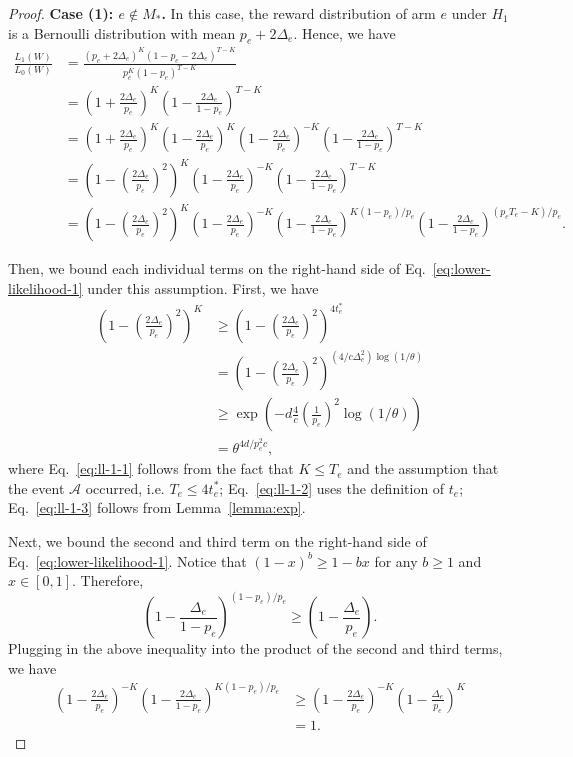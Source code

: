 \documentclass{article}
\begin{document}
\begin{spacing}{1.1}
\begin{proof}
\textbf{Case (1): $e\not \in M_*$.}
In this case, the reward distribution of arm $e$ under $H_1$ is a Bernoulli distribution with mean $p_e+2\Delta_e$. 
Hence, we have
\begin{align}
  \frac{L_1(W)}{L_0(W)} &= \frac{(p_e+2\Delta_e)^{K} (1-p_e-2\Delta_e)^{T-K}}{p_e^K(1-p_e)^{T-K}} \nonumber \\
  						&=\left(1+\frac{2\Delta_e}{p_e}\right)^K\left(1-\frac{2\Delta_e}{1-p_e}\right)^{T-K} \nonumber\\
  						&=\left(1+\frac{2\Delta_e}{p_e}\right)^K
                          \left(1-\frac{2\Delta_e}{p_e}\right)^K\left(1-\frac{2\Delta_e}{p_e}\right)^{-K}
  						  \left(1-\frac{2\Delta_e}{1-p_e}\right)^{T-K} \nonumber\\
  						&=\left(1-\left(\frac{2\Delta_e}{p_e}\right)^2\right)^K\left(1-\frac{2\Delta_e}{p_e}\right)^{-K}
  						  \left(1-\frac{2\Delta_e}{1-p_e}\right)^{T-K} \nonumber \\
  						&=\left(1-\left(\frac{2\Delta_e}{p_e}\right)^2\right)^K\left(1-\frac{2\Delta_e}{p_e}\right)^{-K}
  						  \left(1-\frac{2\Delta_e}{1-p_e}\right)^{K(1-p_e)/p_e}
  						  \left(1-\frac{2\Delta_e}{1-p_e}\right)^{(p_eT_e-K)/p_e} \label{eq:lower-likelihood-1}.
\end{align}

Then, we bound each individual terms on the right-hand side of Eq.~\eqref{eq:lower-likelihood-1} under this assumption.
First, we have
\begin{align}
\left(1-\left(\frac{2\Delta_e}{p_e}\right)^2\right)^K &\ge 
\left(1-\left(\frac{2\Delta_e}{p_e}\right)^2\right)^{4t_e^*} \label{eq:ll-1-1}\\
&= \left(1-\left(\frac{2\Delta_e}{p_e}\right)^2\right)^{(4/c\Delta_e^2)\log(1/\theta)} \label{eq:ll-1-2}\\
&\ge \exp\left(-d\frac{4}{c}\left(\frac1{p_e}\right)^2\log(1/\theta) \right) \label{eq:ll-1-3} \\
& = \theta^{4d/p_e^2c} \label{eq:ll-1-4},
\end{align}
where Eq.~\eqref{eq:ll-1-1} follows from the fact that $K \le T_e$ and the assumption that the event $\mathcal A$ occurred, i.e. $T_e \le 4t_e^*$; 
Eq.~\eqref{eq:ll-1-2} uses the definition of $t_e$;
Eq.~\eqref{eq:ll-1-3} follows from Lemma~\ref{lemma:exp}.

Next, we bound the second and third term on the right-hand side of Eq.~\eqref{eq:lower-likelihood-1}.
Notice that $(1-x)^b \ge 1-bx$ for any $b \ge 1$ and $x \in [0,1]$.
Therefore, 
$$
\left(1-\frac{\Delta_e}{1-p_e}\right)^{(1-p_e)/p_e} \ge \left(1-\frac{\Delta_e}{p_e}\right).
$$
Plugging in the above inequality into the product of the second and third terms, we have
\begin{align}
\left(1-\frac{2\Delta_e}{p_e}\right)^{-K}\left(1-\frac{2\Delta_e}{1-p_e}\right)^{K(1-p_e)/p_e} &
\ge \left(1-\frac{2\Delta_e}{p_e}\right)^{-K}\left(1-\frac{\Delta_e}{p_e}\right)^K \nonumber \\
&= 1 \label{eq:ll-1.5}.
\end{align}


\end{proof}
\end{spacing}
\end{document}
